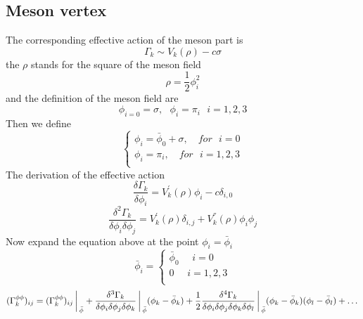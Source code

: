 \documentclass[UTF8]{article}
\begin{document}
\subsection{Meson vertex}
The corresponding effective action of the meson part is
\begin{equation}
	\Gamma_k \sim V_k(\rho)-c\sigma
\end{equation}
the $\rho$ stands for the square of the meson field
\begin{equation}
	\rho=\frac{1}{2}\phi^2_i
\end{equation}
and the definition of the meson field are
\begin{equation}
	\phi_{i=0}=\sigma ,\,\,\,\,\phi_i=\pi_i\,\,\,\,i=1,2,3
\end{equation}
Then we define 
\begin{equation}
\begin{cases}
\phi_i=\bar{\phi}_0+\sigma,\quad for\,\,\,\, i=0\\
\phi_i=\pi_i,\quad for\,\,\,\, i=1,2,3\\
\end{cases}
\end{equation}
The derivation of the effective action 
\begin{equation}
	\frac{\delta \Gamma_k}{\delta \phi_i}=V^{'}_k(\rho)\phi_i-c\delta_{i,0}
\end{equation}
\begin{equation}
	\frac{\delta^2\Gamma_k}{\delta\phi_i\delta\phi_j}=V^{'}_k(\rho)\delta_{i,j}+V^{''}_k(\rho)\phi_i\phi_j
\end{equation}
Now expand the equation above at the point $\phi_i=\bar{\phi}_i$
\begin{equation}
\bar{\phi}_i=
	\begin{cases}
\bar{\phi}_0\,\,\,\,\,\,\,\, i=0\\
0\,\,\,\,\,\,\,\, i=1,2,3\\
\end{cases}
\end{equation}
\begin{equation}
	(\Gamma^{\phi\phi}_k)_{ij}=(\Gamma^{\phi\phi}_k)_{ij}\bigg\arrowvert_{\bar{\phi}}+\frac{\delta^3\Gamma_k}{\delta\phi_i\delta\phi_j\delta\phi_k}\bigg\arrowvert_{\bar{\phi}}(\phi_k-\bar{\phi}_k)+\frac{1}{2}\frac{\delta^4\Gamma_k}{\delta\phi_i\delta\phi_j\delta\phi_k\delta\phi_l}\bigg\arrowvert_{\bar{\phi}}(\phi_k-\bar{\phi}_k)(\phi_l-\bar{\phi}_l)+\dots
\end{equation}
\end{document}

